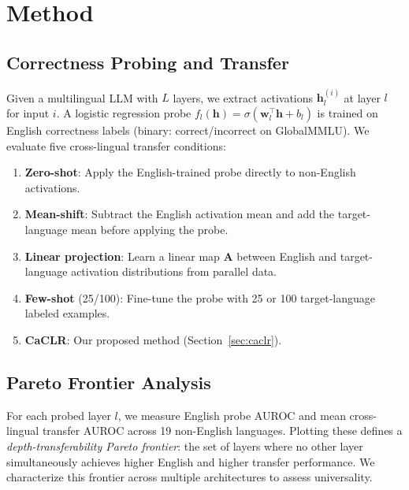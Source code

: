 \documentclass[11pt,a4paper]{article}
\begin{document}
\section{Method}
\label{sec:method}

\subsection{Correctness Probing and Transfer}
\label{sec:probing}

Given a multilingual LLM with $L$ layers, we extract activations $\mathbf{h}_l^{(i)}$ at layer $l$ for input $i$. A logistic regression probe $f_l(\mathbf{h}) = \sigma(\mathbf{w}_l^\top \mathbf{h} + b_l)$ is trained on English correctness labels (binary: correct/incorrect on GlobalMMLU). We evaluate five cross-lingual transfer conditions:

\begin{enumerate}
\item \textbf{Zero-shot}: Apply the English-trained probe directly to non-English activations.
\item \textbf{Mean-shift}: Subtract the English activation mean and add the target-language mean before applying the probe.
\item \textbf{Linear projection}: Learn a linear map $\mathbf{A}$ between English and target-language activation distributions from parallel data.
\item \textbf{Few-shot} (25/100): Fine-tune the probe with 25 or 100 target-language labeled examples.
\item \textbf{CaCLR}: Our proposed method (Section~\ref{sec:caclr}).
\end{enumerate}

\subsection{Pareto Frontier Analysis}
\label{sec:pareto}

For each probed layer $l$, we measure English probe AUROC and mean cross-lingual transfer AUROC across 19 non-English languages. Plotting these defines a \emph{depth-transferability Pareto frontier}: the set of layers where no other layer simultaneously achieves higher English and higher transfer performance. We characterize this frontier across multiple architectures to assess universality.
\end{document}
